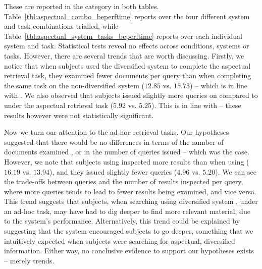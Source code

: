 These are reported in the  category in both tables. Table~\ref{tbl:aspectual_combo_beperftime} reports over the four different system and task combinations trialled, while Table~\ref{tbl:aspectual_system_tasks_beperftime} reports over each individual system and task. Statistical tests reveal no effects across conditions, systems or tasks. However, there are several trends that are worth discussing. Firstly, we notice that when subjects used the diversified system  to complete the aspectual retrieval task, they examined fewer documents per query than when completing the same task on the non-diversified system  ($12.85$ vs. $15.73$) -- which is in line with . We also observed that subjects issued slightly more queries on  compared to  under the aspectual retrieval task ($5.92$ vs. $5.25$). This is in line with  -- these results however were not statistically significant.

Now we turn our attention to the ad-hoc retrieval tasks. Our hypotheses suggested that there would be no differences in terms of the number of documents examined , or in the number of queries issued  -- which was the case. However, we note that subjects using  inspected more results than when using  ($16.19$ vs. $13.94$), and they issued slightly fewer queries ($4.96$ vs. $5.20$). We can see the trade-offs between queries and the number of results inspected per query, where more queries tends to lead to fewer results being examined, and vice versa. This trend suggests that subjects, when searching using diversified system , under an ad-hoc task, may have had to dig deeper to find more relevant material, due to the system's performance. Alternatively, this trend could be explained by suggesting that the system encouraged subjects to go deeper, something that we intuitively expected when subjects were searching for aspectual, diversified information. Either way, no conclusive evidence to support our hypotheses exists -- merely trends.

